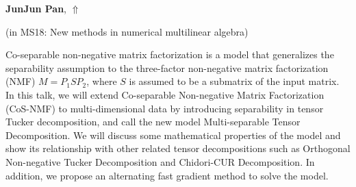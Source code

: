 \documentclass[ILAS2025-program.tex]{subfiles}
\begin{document}
\hypertarget{down0190}{}\begin{ilasabstract}
    
\textbf{JunJun Pan},  \hfill \hyperlink{up0190}{$\Uparrow$}
    
    
(in {\color{mstitle}MS18: New methods in numerical multilinear algebra})
        
\mtskip
    Co-separable non-negative matrix factorization is a model that generalizes the separability assumption to the three-factor non-negative matrix factorization (NMF) $M=P_1 S P_2$, where $S$ is assumed to be a submatrix of the input matrix. In this talk, we will extend Co-separable Non-negative Matrix Factorization (CoS-NMF) to multi-dimensional data by introducing separability in tensor Tucker decomposition, and call the new model Multi-separable Tensor Decomposition. We will discuss some mathematical properties of the model and show its relationship with other related tensor decompositions such as Orthogonal Non-negative Tucker Decomposition and Chidori-CUR Decomposition. In addition, we propose an alternating fast gradient method to solve the model.
\end{ilasabstract}
    
\end{document}
